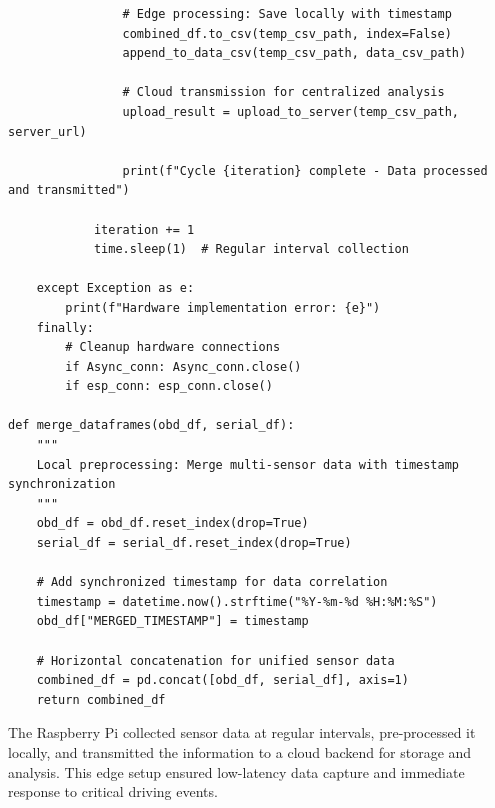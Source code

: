 \begin{lstlisting}
                # Edge processing: Save locally with timestamp
                combined_df.to_csv(temp_csv_path, index=False)
                append_to_data_csv(temp_csv_path, data_csv_path)
                
                # Cloud transmission for centralized analysis
                upload_result = upload_to_server(temp_csv_path, server_url)
                
                print(f"Cycle {iteration} complete - Data processed and transmitted")
            
            iteration += 1
            time.sleep(1)  # Regular interval collection
            
    except Exception as e:
        print(f"Hardware implementation error: {e}")
    finally:
        # Cleanup hardware connections
        if Async_conn: Async_conn.close()
        if esp_conn: esp_conn.close()

def merge_dataframes(obd_df, serial_df):
    """
    Local preprocessing: Merge multi-sensor data with timestamp synchronization
    """
    obd_df = obd_df.reset_index(drop=True)
    serial_df = serial_df.reset_index(drop=True)
    
    # Add synchronized timestamp for data correlation
    timestamp = datetime.now().strftime("%Y-%m-%d %H:%M:%S")
    obd_df["MERGED_TIMESTAMP"] = timestamp
    
    # Horizontal concatenation for unified sensor data
    combined_df = pd.concat([obd_df, serial_df], axis=1)
    return combined_df

        \end{lstlisting}

        The Raspberry Pi collected sensor data at regular intervals, pre-processed it locally, and transmitted the information to a cloud backend for storage and analysis. This edge setup ensured low-latency data capture and immediate response to critical driving events.

